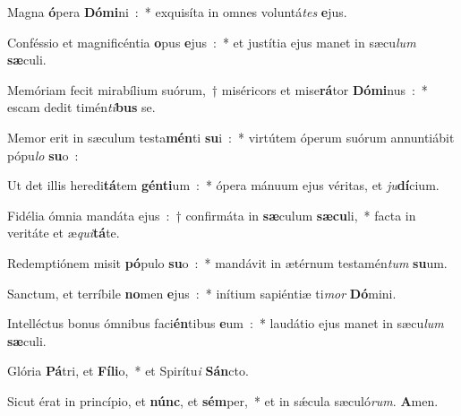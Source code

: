 ﻿\item Magna\textbf{ ó}\-pera\textbf{ Dó}\-\textbf{mi}\-ni~:~* exquisíta in omnes voluntá\emph{tes}\-\textbf{ e}jus.
\item Conféssio et magnificéntia\textbf{ o}\-pus\textbf{ e}\-jus~:~* et justítia ejus manet in sæcu\emph{lum}\-\textbf{ sæ}culi.
\item Memóriam fecit mirabílium suórum,~† miséricors et mise\textbf{rá}\-tor\textbf{ Dó}\-\textbf{mi}\-nus~:~* escam dedit timén\emph{ti}\-\textbf{bus} se.
\item Memor erit in sæculum testa\textbf{mén}\-ti\textbf{ su}\-i~:~* virtútem óperum suórum annuntiábit pópu\emph{lo}\-\textbf{ su}o~:
\item Ut det illis heredi\textbf{tá}\-tem\textbf{ gén}\-\textbf{ti}\-um~:~* ópera mánuum ejus véritas, et\emph{ ju}\textbf{dí}cium.
\item Fidélia ómnia mandáta ejus~:~† confirmáta in\textbf{ sæ}\-culum\textbf{ sæ}\-\textbf{cu}\-li,~* facta in veritáte et æ\emph{qui}\textbf{tá}te.
\item Redemptiónem misit\textbf{ pó}\-pulo\textbf{ su}\-o~:~* mandávit in ætérnum testamén\emph{tum}\-\textbf{ su}um.
\item Sanctum, et terríbile\textbf{ no}\-men\textbf{ e}\-jus~:~* inítium sapiéntiæ ti\emph{mor}\-\textbf{ Dó}mini.
\item Intelléctus bonus ómnibus faci\textbf{én}\-tibus\textbf{ e}\-um~:~* laudátio ejus manet in sæcu\emph{lum}\-\textbf{ sæ}culi.
\item Glória\textbf{ Pá}\-tri, et\textbf{ Fí}\-\textbf{li}\-o,~* et Spirítu\emph{i}\-\textbf{ Sán}cto.
\item Sicut érat in princípio, et\textbf{ núnc}, et\textbf{ sém}\-per,~* et in sǽcula sæculó\emph{rum}.\textbf{ A}men.